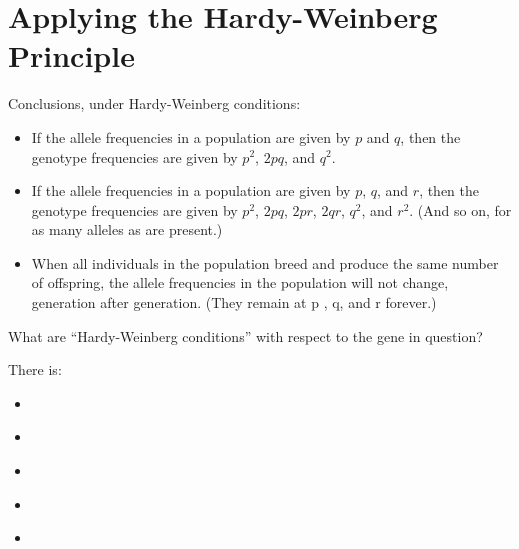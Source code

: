\section{Applying the Hardy-Weinberg Principle}

\begin{frame}
\begin{adjustwidth}{-1.5em}{-1.5em}
Conclusions, under Hardy-Weinberg conditions: 

\begin{itemize}[<+->]
    \item If the allele frequencies in a population are given by $p$ and $q$,
        then the genotype frequencies are given by $p^2$, $2pq$, and $q^2$.

        \vspace{1cm}
    \item If the allele frequencies in a population are given by $p$, $q$, and
        $r$, then the genotype frequencies are given by $p^2$, $2pq$, $2pr$,
        $2qr$, $q^2$, and $r^2$. (And so on, for as many alleles as are
        present.)

        \vspace{1cm}
    \item When all individuals in the population breed and produce the same
        number of offspring, the allele frequencies in the population will not
        change, generation after generation. (They remain at p , q, and r
        forever.)
\end{itemize}

\end{adjustwidth}
\end{frame}

\begin{frame}
\begin{adjustwidth}{-1.5em}{-1.5em}
    What are ``Hardy-Weinberg conditions'' with respect to the gene in question?
    
    \vspace{0.5cm}
    There is:
    \begin{itemize}
        \item \ 
        \item \ 
        \item \ 
        \item \ 
        \item \ 
    \end{itemize}

    \vspace{0.5cm}

\end{adjustwidth}
\end{frame}

